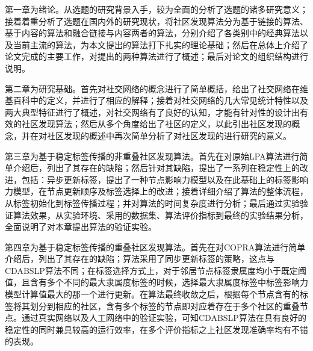 第一章为绪论。从选题的研究背景入手，较为全面的分析了选题的诸多研究意义；接着着重分析了选题在国内外的研究现状，将社区发现算法分为基于链接的算法、基于内容的算法和融合链接与内容两者的算法，分别介绍了各类别中的经典算法以及当前主流的算法，为本文提出的算法打下扎实的理论基础；然后在总体上介绍了论文完成的主要工作，对提出的两种算法进行了概述；最后对论文的组织结构进行说明。

第二章为研究基础。首先对社交网络的概念进行了简单概括，给出了社交网络在维基百科中的定义，并进行了相应的解释；接着对社交网络的几大常见统计特性以及两大典型特征进行了概述，对社交网络有了良好的认知，才能有针对性的设计出有效的社区发现算法；然后从多个角度给出了社区的定义，以此引出社区发现的概念，并在对社区发现的概述中再次简单分析了对社区发现的进行研究的意义。

第三章为基于稳定标签传播的非重叠社区发现算法。首先在对原始LPA算法进行简单介绍后，列出了其存在的缺陷；然后针对其缺陷，提出了一系列在稳定性上的改进，包括：异步更新标签，提出了一种节点影响力模型以及在此基础上的标签影响力模型，在节点更新顺序及标签选择上的改进；接着详细介绍了算法的整体流程，从标签初始化到标签传播过程；并对算法的时间复杂度进行分析；最后通过实验验证算法效果，从实验环境、采用的数据集、算法评价指标到最终的实验结果分析，全面说明了对本章提出算法的验证实验。

第四章为基于稳定标签传播的重叠社区发现算法。首先在对COPRA算法进行简单介绍后，列出了其存在的缺陷；算法采用了同步更新标签的策略，这点与CDABSLP算法不同；在标签选择方式上，对于邻居节点标签隶属度均小于既定阈值，且含有多个不同的最大隶属度标签的时候，选择最大隶属度标签中标签影响力模型计算值最大的那一个进行更新。在算法最终收敛之后，根据每个节点含有的标签将其划分到相应的社区，含有多个标签的节点即对应着存在于多个社区的重叠节点。通过真实网络以及人工网络中的验证实验，可知CDABSLP算法在具有良好的稳定性的同时兼具较高的运行效率，在多个评价指标之上社区发现准确率均有不错的表现。